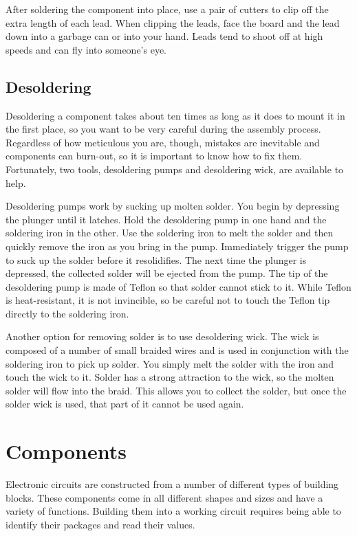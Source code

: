 After soldering the component into place, use a pair of cutters to
clip off the extra length of each lead. When clipping the leads, face
the board and the lead down into a garbage can or into your
hand. Leads tend to shoot off at high speeds and can fly into
someone's eye.

\subsection{Desoldering}

Desoldering a component takes about ten times as long as it does to
mount it in the first place, so you want to be very careful during the
assembly process. Regardless of how meticulous you are, though,
mistakes are inevitable and components can burn-out, so it is
important to know how to fix them. Fortunately, two tools, desoldering
pumps and desoldering wick, are available to help.

Desoldering pumps work by sucking up molten solder. You begin by
depressing the plunger until it latches. Hold the desoldering pump in
one hand and the soldering iron in the other. Use the soldering iron
to melt the solder and then quickly remove the iron as you bring in
the pump. Immediately trigger the pump to suck up the solder before it
resolidifies. The next time the plunger is depressed, the collected
solder will be ejected from the pump. The tip of the desoldering pump
is made of Teflon so that solder cannot stick to it. While Teflon is
heat-resistant, it is not invincible, so be careful not to touch the
Teflon tip directly to the soldering iron.

Another option for removing solder is to use desoldering wick. The
wick is composed of a number of small braided wires and is used in
conjunction with the soldering iron to pick up solder. You simply melt
the solder with the iron and touch the wick to it. Solder has a strong
attraction to the wick, so the molten solder will flow into the
braid. This allows you to collect the solder, but once the solder wick
is used, that part of it cannot be used again.

\section{Components}

Electronic circuits are constructed from a number of different types
of building blocks. These components come in all different shapes and
sizes and have a variety of functions. Building them into a working
circuit requires being able to identify their packages and read their
values.

